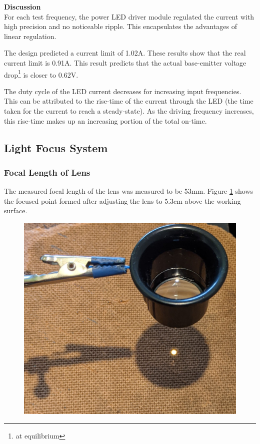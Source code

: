 \textbf{Discussion}\\
For each test frequency, the power LED driver module regulated the current with high precision and no noticeable ripple. This encapsulates the advantages of linear regulation.

The design predicted a current limit of 1.02A. These results show that the real current limit is 0.91A. This result predicts that the actual base-emitter voltage drop\footnote{at equilibrium} is closer to 0.62V.

The duty cycle of the LED current decreases for increasing input frequencies. This can be attributed to the rise-time of the current through the LED (the time taken for the current to reach a steady-state). As the driving frequency increases, this rise-time makes up an increasing portion of the total on-time.







\subsection{Light Focus System}

\subsubsection{Focal Length of Lens}

The measured focal length of the lens was measured to be 53mm. Figure \ref{fig:focal_length_experiemnt_result} shows the focused point formed after adjusting the lens to 5.3cm above the working surface.

\begin{figure}[H]
	\centering
	\includegraphics[width=.6\linewidth]{figures/results/focal_length_result.jpg}
	\label{fig:focal_length_experiemnt_result}
\end{figure}


